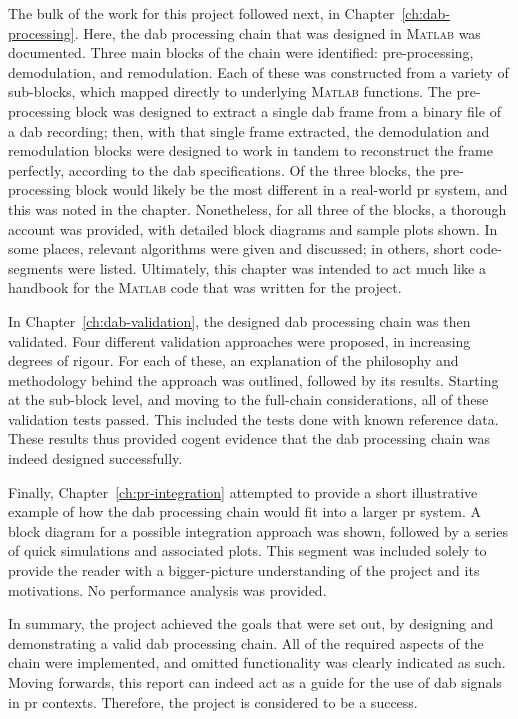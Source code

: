 \documentclass[class=report,11pt,crop=false]{standalone}
\begin{document}
The bulk of the work for this project followed next, in Chapter~\ref{ch:dab-processing}. Here, the \gls{dab} processing chain that was designed in \textsc{Matlab} was documented. Three main blocks of the chain were identified: pre-processing, demodulation, and remodulation. Each of these was constructed from a variety of sub-blocks, which mapped directly to underlying \textsc{Matlab} functions. The pre-processing block was designed to extract a single \gls{dab} frame from a binary file of a \gls{dab} recording; then, with that single frame extracted, the demodulation and remodulation blocks were designed to work in tandem to reconstruct the frame perfectly, according to the \gls{dab} specifications. Of the three blocks, the pre-processing block would likely be the most different in a real-world \gls{pr} system, and this was noted in the chapter. Nonetheless, for all three of the blocks, a thorough account was provided, with detailed block diagrams and sample plots shown. In some places, relevant algorithms were given and discussed; in others, short code-segments were listed. Ultimately, this chapter was intended to act much like a handbook for the \textsc{Matlab} code that was written for the project.

In Chapter~\ref{ch:dab-validation}, the designed \gls{dab} processing chain was then validated. Four different validation approaches were proposed, in increasing degrees of rigour. For each of these, an explanation of the philosophy and methodology behind the approach was outlined, followed by its results. Starting at the sub-block level, and moving to the full-chain considerations, all of these validation tests passed. This included the tests done with known reference data. These results thus provided cogent evidence that the \gls{dab} processing chain was indeed designed successfully.

Finally, Chapter~\ref{ch:pr-integration} attempted to provide a short illustrative example of how the \gls{dab} processing chain would fit into a larger \gls{pr} system. A block diagram for a possible integration approach was shown, followed by a series of quick simulations and associated plots. This segment was included solely to provide the reader with a bigger-picture understanding of the project and its motivations. No performance analysis was provided.

In summary, the project achieved the goals that were set out, by designing and demonstrating a valid \gls{dab} processing chain. All of the required aspects of the chain were implemented, and omitted functionality was clearly indicated as such.  Moving forwards, this report can indeed act as a guide for the use of \gls{dab} signals in \gls{pr} contexts. Therefore, the project is considered to be a success.

\ifstandalone

\printnoidxglossary[type=\acronymtype,nonumberlist]
\fi
\end{document}
